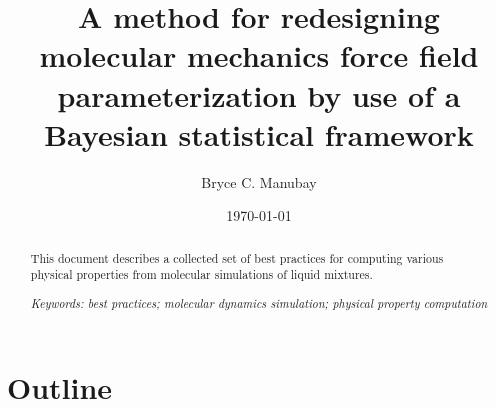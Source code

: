 \documentclass[aps,pre,onecolumn,nofootinbib,superscriptaddress,linenumbers,12pt, draft,tightenlines]{revtex4-1}
\begin{document}


\title{A method for redesigning molecular mechanics force field parameterization by use of a Bayesian statistical framework}

\author{Bryce C. Manubay} 

\date{\today}


\begin{abstract}
This document describes a collected set of best practices for computing various physical properties from molecular simulations of liquid mixtures.

\emph{Keywords: best practices; molecular dynamics simulation; physical property computation}


\end{abstract}
\maketitle

\listoftodos

\section{Outline}
\end{document}
